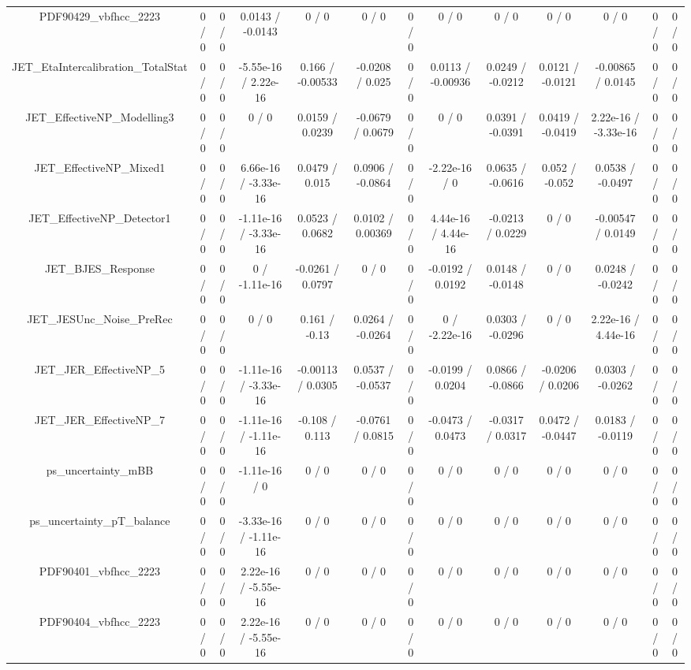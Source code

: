 \documentclass[10pt]{article}
\begin{document}
\begin{table}[htbp]
\begin{center}
\begin{tabular}{|c|c|c|c|c|c|c|c|c|c|c|c|c|}
  PDF90429_vbfhcc_2223 & 0 / 0 & 0 / 0 & 0.0143 / -0.0143 & 0 / 0 & 0 / 0 & 0 / 0 & 0 / 0 & 0 / 0 & 0 / 0 & 0 / 0 & 0 / 0 & 0 / 0 \\ 
  JET_EtaIntercalibration_TotalStat & 0 / 0 & 0 / 0 & -5.55e-16 / 2.22e-16 & 0.166 / -0.00533 & -0.0208 / 0.025 & 0 / 0 & 0.0113 / -0.00936 & 0.0249 / -0.0212 & 0.0121 / -0.0121 & -0.00865 / 0.0145 & 0 / 0 & 0 / 0 \\ 
  JET_EffectiveNP_Modelling3 & 0 / 0 & 0 / 0 & 0 / 0 & 0.0159 / 0.0239 & -0.0679 / 0.0679 & 0 / 0 & 0 / 0 & 0.0391 / -0.0391 & 0.0419 / -0.0419 & 2.22e-16 / -3.33e-16 & 0 / 0 & 0 / 0 \\ 
  JET_EffectiveNP_Mixed1 & 0 / 0 & 0 / 0 & 6.66e-16 / -3.33e-16 & 0.0479 / 0.015 & 0.0906 / -0.0864 & 0 / 0 & -2.22e-16 / 0 & 0.0635 / -0.0616 & 0.052 / -0.052 & 0.0538 / -0.0497 & 0 / 0 & 0 / 0 \\ 
  JET_EffectiveNP_Detector1 & 0 / 0 & 0 / 0 & -1.11e-16 / -3.33e-16 & 0.0523 / 0.0682 & 0.0102 / 0.00369 & 0 / 0 & 4.44e-16 / 4.44e-16 & -0.0213 / 0.0229 & 0 / 0 & -0.00547 / 0.0149 & 0 / 0 & 0 / 0 \\ 
  JET_BJES_Response & 0 / 0 & 0 / 0 & 0 / -1.11e-16 & -0.0261 / 0.0797 & 0 / 0 & 0 / 0 & -0.0192 / 0.0192 & 0.0148 / -0.0148 & 0 / 0 & 0.0248 / -0.0242 & 0 / 0 & 0 / 0 \\ 
  JET_JESUnc_Noise_PreRec & 0 / 0 & 0 / 0 & 0 / 0 & 0.161 / -0.13 & 0.0264 / -0.0264 & 0 / 0 & 0 / -2.22e-16 & 0.0303 / -0.0296 & 0 / 0 & 2.22e-16 / 4.44e-16 & 0 / 0 & 0 / 0 \\ 
  JET_JER_EffectiveNP_5 & 0 / 0 & 0 / 0 & -1.11e-16 / -3.33e-16 & -0.00113 / 0.0305 & 0.0537 / -0.0537 & 0 / 0 & -0.0199 / 0.0204 & 0.0866 / -0.0866 & -0.0206 / 0.0206 & 0.0303 / -0.0262 & 0 / 0 & 0 / 0 \\ 
  JET_JER_EffectiveNP_7 & 0 / 0 & 0 / 0 & -1.11e-16 / -1.11e-16 & -0.108 / 0.113 & -0.0761 / 0.0815 & 0 / 0 & -0.0473 / 0.0473 & -0.0317 / 0.0317 & 0.0472 / -0.0447 & 0.0183 / -0.0119 & 0 / 0 & 0 / 0 \\ 
  ps_uncertainty_mBB & 0 / 0 & 0 / 0 & -1.11e-16 / 0 & 0 / 0 & 0 / 0 & 0 / 0 & 0 / 0 & 0 / 0 & 0 / 0 & 0 / 0 & 0 / 0 & 0 / 0 \\ 
  ps_uncertainty_pT_balance & 0 / 0 & 0 / 0 & -3.33e-16 / -1.11e-16 & 0 / 0 & 0 / 0 & 0 / 0 & 0 / 0 & 0 / 0 & 0 / 0 & 0 / 0 & 0 / 0 & 0 / 0 \\ 
  PDF90401_vbfhcc_2223 & 0 / 0 & 0 / 0 & 2.22e-16 / -5.55e-16 & 0 / 0 & 0 / 0 & 0 / 0 & 0 / 0 & 0 / 0 & 0 / 0 & 0 / 0 & 0 / 0 & 0 / 0 \\ 
  PDF90404_vbfhcc_2223 & 0 / 0 & 0 / 0 & 2.22e-16 / -5.55e-16 & 0 / 0 & 0 / 0 & 0 / 0 & 0 / 0 & 0 / 0 & 0 / 0 & 0 / 0 & 0 / 0 & 0 / 0 \\ 

\end{tabular}
\end{center}
\end{table}
\end{document}
